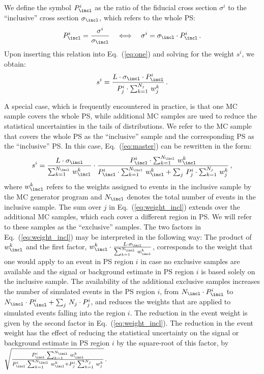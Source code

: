 We define the symbol $P_{\incl}^{i}$ as the ratio of the fiducial cross section $\sigma^{i}$ to the ``inclusive'' cross section $\sigma_{\incl}$,
which refers to the whole PS:
\begin{equation*}
P_{\incl}^{i} = \frac{\sigma^{i}}{\sigma_{\incl}} \quad \Longleftrightarrow \quad \sigma^{i} = \sigma_{\incl} \cdot P_{\incl}^{i} \, .
\label{eq:two}
\end{equation*}
Upon inserting this relation into Eq.~(\ref{eq:one}) and solving for the weight $s^{i}$, we obtain:
\begin{equation}
s^{i} = \frac{L \cdot \sigma_{\incl} \cdot P_{\incl}^{i}}{P_{j}^{i} \cdot \sum_{k=1}^{N_{j}} \, w_{j}^{k}} \, .
\label{eq:master}
\end{equation}

A special case, which is frequently encountered in practice,
is that one MC sample covers the whole PS,
while additional MC samples are used to reduce the statistical uncertainties in the tails of distributions.
We refer to the MC sample that covers the whole PS as the ``inclusive'' sample and the corresponding PS as the ``inclusive'' PS.
In this case, Eq.~(\ref{eq:master}) can be rewritten in the form:
\begin{equation}
s^{i} = \frac{L \cdot \sigma_{\incl}}{\sum_{k=1}^{N_{\incl}} \, w_{\incl}^{k}} \cdot \frac{P_{\incl}^{i} \cdot \sum_{k=1}^{N_{\incl}} \, w_{\incl}^{k}}{P_{\incl}^{i} \cdot \sum_{k=1}^{N_{\incl}} \, w_{\incl}^{k} + \sum_{j} \, P_{j}^{i} \cdot \sum_{k=1}^{N_{j}} \, w_{j}^{k}} \, ,
\label{eq:weight_incl}
\end{equation}
where $w_{\incl}^{k}$ refers to the weights assigned to events in the inclusive sample by the MC generator program and $N_{\incl}$ denotes the total number of events in the inclusive sample.
The sum over $j$ in Eq.~(\ref{eq:weight_incl}) extends over the additional MC samples, which each cover a different region in PS.
We will refer to these samples as the ``exclusive'' samples.
The two factors in Eq.~(\ref{eq:weight_incl}) may be interpreted in the following way:
The product of $w_{\incl}^{k}$ and the first factor, $w_{\incl}^{k} \cdot \frac{L \cdot \sigma_{\incl}}{\sum_{k=1}^{N_{\incl}} \, w_{\incl}^{k}}$,
corresponds to the weight that one would apply to an event in PS region $i$ 
in case no exclusive samples are available and the signal or background estimate in PS region $i$ is based solely on the inclusive sample.
The availability of the additional exclusive samples increases the number of simulated events in the PS region $i$, 
from $N_{\incl} \cdot P_{\incl}^{i}$ to $N_{\incl} \cdot P_{\incl}^{i} + \sum_{j} \, N_{j} \cdot P_{j}^{i}$,
and reduces the weights that are applied to simulated events falling into the region $i$.
The reduction in the event weight is given by the second factor in Eq.~(\ref{eq:weight_incl}).
The reduction in the event weight has the effect of reducing the statistical uncertainty on the signal or background estimate in PS region $i$
by the square-root of this factor,
\ie by $\sqrt{\frac{P_{\incl}^{i} \cdot \sum_{k=1}^{N_{\incl}} \, w_{\incl}^{k}}{P_{\incl}^{i} \cdot \sum_{k=1}^{N_{\incl}} \, w_{\incl}^{k} + P_{j}^{i} \cdot \sum_{k=1}^{N_{j}} \, w_{j}^{k}}}$.
